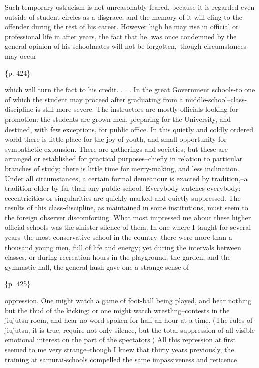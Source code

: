 Such temporary ostracism is not unreasonably feared, because it is regarded even outside of student-circles as a disgrace; and the memory of it will cling to the offender during the rest of his career. However high he may rise in official or professional life in after years, the fact that he. was once condemned by the general opinion of his schoolmates will not be forgotten,--though circumstances may occur

\{p. 424\}

which will turn the fact to his credit. . . . In the great Government schools-to one of which the student may proceed after graduating from a middle-school--class-discipline is still more severe. The instructors are mostly officials looking for promotion: the students are grown men, preparing for the University, and destined, with few exceptions, for public office. In this quietly and coldly ordered world there is little place for the joy of youth, and small opportunity for sympathetic expansion. There are gatherings and societies; but these are arranged or established for practical purposes--chiefly in relation to particular branches of study; there is little time for merry-making, and less inclination. Under all circumstances, a certain formal demeanour is exacted by tradition,--a tradition older by far than any public school. Everybody watches everybody: eccentricities or singularities are quickly marked and quietly suppressed. The results of this class-discipline, as maintained in some institutions, must seem to the foreign observer discomforting. What most impressed me about these higher official schools was the sinister silence of them. In one where I taught for several years--the most conservative school in the country--there were more than a thousand young men, full of life and energy; yet during the intervals between classes, or during recreation-hours in the playground, the garden, and the gymnastic hall, the general hush gave one a strange sense of

\{p. 425\}

oppression. One might watch a game of foot-ball being played, and hear nothing but the thud of the kicking; or one might watch wrestling--contests in the jiujutsu-room, and hear no word spoken for half an hour at a time. (The rules of jiujutsu, it is true, require not only silence, but the total suppression of all visible emotional interest on the part of the spectators.) All this repression at first seemed to me very strange--though I knew that thirty years previously, the training at samurai-schools compelled the same impassiveness and reticence.



